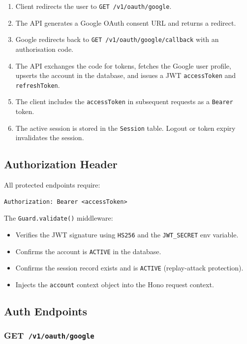 \documentclass[12pt,a4paper]{article}
\newcommand{\httpget}[1]{%
  \colorbox{getcolor!20}{\textcolor{getcolor}{\textbf{\small GET}}}~\texttt{#1}%
}
\begin{document}
\begin{enumerate}[label=\arabic*.]
  \item Client redirects the user to \texttt{GET /v1/oauth/google}.
  \item The API generates a Google OAuth consent URL and returns a redirect.
  \item Google redirects back to \texttt{GET /v1/oauth/google/callback} with an authorisation code.
  \item The API exchanges the code for tokens, fetches the Google user profile, upserts the account in the database, and issues a JWT \texttt{accessToken} and \texttt{refreshToken}.
  \item The client includes the \texttt{accessToken} in subsequent requests as a \texttt{Bearer} token.
  \item The active session is stored in the \texttt{Session} table. Logout or token expiry invalidates the session.
\end{enumerate}

\subsection{Authorization Header}

All protected endpoints require:

\begin{lstlisting}
Authorization: Bearer <accessToken>
\end{lstlisting}

The \texttt{Guard.validate()} middleware:
\begin{itemize}
  \item Verifies the JWT signature using \texttt{HS256} and the \texttt{JWT\_SECRET} env variable.
  \item Confirms the account is \texttt{ACTIVE} in the database.
  \item Confirms the session record exists and is \texttt{ACTIVE} (replay-attack protection).
  \item Injects the \texttt{account} context object into the Hono request context.
\end{itemize}

\subsection{Auth Endpoints}

\subsubsection{\httpget{/v1/oauth/google}}
\end{document}
